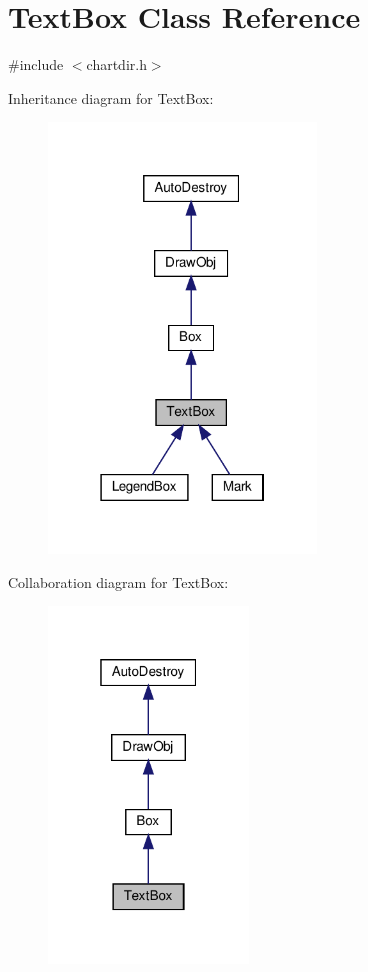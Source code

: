 \hypertarget{class_text_box}{}\section{Text\+Box Class Reference}
\label{class_text_box}


{\ttfamily \#include $<$chartdir.\+h$>$}



Inheritance diagram for Text\+Box\+:
\nopagebreak
\begin{figure}[H]
\begin{center}
\leavevmode
\includegraphics[width=202pt]{class_text_box__inherit__graph}
\end{center}
\end{figure}


Collaboration diagram for Text\+Box\+:
\nopagebreak
\begin{figure}[H]
\begin{center}
\leavevmode
\includegraphics[width=151pt]{class_text_box__coll__graph}
\end{center}
\end{figure}
